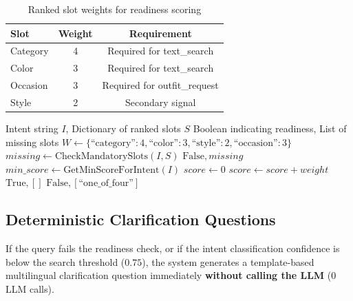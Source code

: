 \begin{table}[H]
\centering
\begin{tabular}{lcc}
\toprule
\textbf{Slot} & \textbf{Weight} & \textbf{Requirement}\\
\midrule
Category & 4 & Required for text\_search\\
Color & 3 & Required for text\_search\\
Occasion & 3 & Required for outfit\_request\\
Style & 2 & Secondary signal\\
\bottomrule
\end{tabular}
\caption{Ranked slot weights for readiness scoring}
\end{table}

\begin{algorithm}[H]
\caption{Slot Readiness Evaluation}\label{alg:slot_readiness}
\begin{algorithmic}[1]
\Require Intent string $I$, Dictionary of ranked slots $S$
\Ensure Boolean indicating readiness, List of missing slots
\State $W \gets \{ \text{``category''}: 4, \text{``color''}: 3, \text{``style''}: 2, \text{``occasion''}: 3 \}$
    \State $missing \gets \text{CheckMandatorySlots}(I, S)$
        \State \Return $\text{False}, missing$
    \EndIf
    \State $min\_score \gets \text{GetMinScoreForIntent}(I)$ 
    \State $score \gets 0$
            \State $score \gets score + weight$
        \EndIf
    \EndFor
        \State \Return $\text{True}, []$
    \Else
        \State \Return $\text{False}, [\text{``one\_of\_four''}]$
    \EndIf
\EndFunction
\end{algorithmic}
\end{algorithm}

\subsection{Deterministic Clarification Questions}
If the query fails the readiness check, or if the intent classification confidence is below the search threshold ($0.75$), the system generates a template-based multilingual clarification question immediately \textbf{without calling the LLM} (0 LLM calls).

